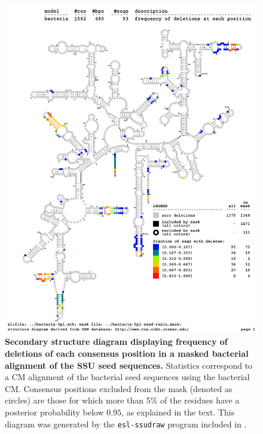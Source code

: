 \begin{figure}
\begin{center}
\includegraphics[width=5.5in]{../../seeds/ss-diagrams/bacteria-0p1-dall-wmask}
\end{center}
\caption[Secondary structure diagram displaying frequency of deletions
  of each consensus position in a masked bacterial alignment of the SSU seed
  sequences]{\textbf{Secondary structure diagram displaying frequency of deletions
  of each consensus position in a masked bacterial alignment of the SSU seed
  sequences.} Statistics correspond to a CM alignment of the bacterial
  seed sequences using the  bacterial CM. Consensus positions
  excluded from the mask (denoted as circles) are those for which 
  more than 5\% of the residues have a posterior probability below
  $0.95$, as explained in the text. This diagram was generated by the
  {\tt esl-ssudraw} program included in .}
\label{fig:bacdelmask}
\end{figure}

